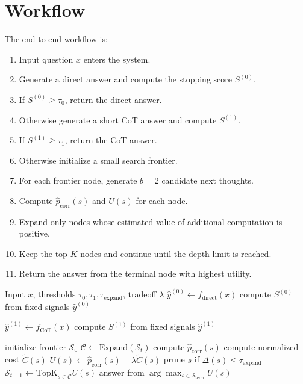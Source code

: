 \documentclass[10pt]{article}
\begin{document}
\section{Workflow}
The end-to-end workflow is:
\begin{enumerate}[leftmargin=1.3em,itemsep=0.12em]
    \item Input question $x$ enters the system.
    \item Generate a direct answer and compute the stopping score $S^{(0)}$.
    \item If $S^{(0)}\ge \tau_0$, return the direct answer.
    \item Otherwise generate a short CoT answer and compute $S^{(1)}$.
    \item If $S^{(1)}\ge \tau_1$, return the CoT answer.
    \item Otherwise initialize a small search frontier.
    \item For each frontier node, generate $b=2$ candidate next thoughts.
    \item Compute $\hat p_{\mathrm{corr}}(s)$ and $U(s)$ for each node.
    \item Expand only nodes whose estimated value of additional computation is positive.
    \item Keep the top-$K$ nodes and continue until the depth limit is reached.
    \item Return the answer from the terminal node with highest utility.
\end{enumerate}

\begin{algorithm}[t]
\caption{Adaptive Reasoning with Cost-Aware Search}
\small
\begin{algorithmic}[1]
\Require Input $x$, thresholds $\tau_0,\tau_1,\tau_{\mathrm{expand}}$, tradeoff $\lambda$
\State $\hat{y}^{(0)} \gets f_{\mathrm{direct}}(x)$
\State compute $S^{(0)}$ from fixed signals
    \State \Return $\hat{y}^{(0)}$
\EndIf

\State $\hat{y}^{(1)} \gets f_{\mathrm{CoT}}(x)$
\State compute $S^{(1)}$ from fixed signals
    \State \Return $\hat{y}^{(1)}$
\EndIf

\State initialize frontier $\mathcal{S}_0$
    \State $\mathcal{C} \gets \mathrm{Expand}(\mathcal{S}_t)$
        \State compute $\hat p_{\mathrm{corr}}(s)$
        \State compute normalized cost $\widetilde C(s)$
        \State $U(s)\gets \hat p_{\mathrm{corr}}(s)-\lambda \widetilde C(s)$
        \State prune $s$ if $\Delta(s)\le \tau_{\mathrm{expand}}$
    \EndFor
    \State $\mathcal{S}_{t+1}\gets \mathrm{TopK}_{s\in\mathcal{C}}U(s)$
\EndFor
\State \Return answer from $\arg\max_{s\in\mathcal{S}_{\mathrm{term}}}U(s)$
\end{algorithmic}
\end{algorithm}
\end{document}
